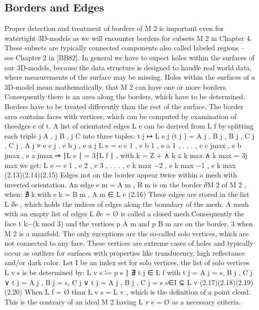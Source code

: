 \documentclass[openany]{book}
\begin{document}
\subsection{Borders and Edges}
Proper detection and treatment of borders of M 2 is important even for watertight
3D-models as we will encounter borders for subsets M 2 in Chapter 4. These 
subsets are typically connected components also called labeled regions – see 
Chapter 2 in [BB82]. In general we have to expect holes within the surfaces of 
our 3D-models, because the data structure is designed to handle real world data, 
where measurements of the surface may be missing.
Holes within the surfaces of a 3D-model mean mathematically, that M 2 can have 
one or more borders. Consequently there is an area along the borders, which have 
to be determined. Borders have to be treated differently than the rest of the 
surface. The border area contains faces with vertices, which can be computed by 
examination of theedges e of t. A list of orientated edges L e can be derived 
from L f by splitting each triple
{j A , j B , j C } into three tuples:
t j ↦ L e j (t j ) = {{A j , B j }, {B j , C j }, {C j , A j }} ≡ {e c j , 
e b j , e a j }
L e = { e c 1 , e b 1 , e a 1 , . . . , e c jmax , e b jmax , e a jmax }
⇒ ∣L e ∣ = 3∣L f ∣ , with k = Z + ∧ k ≤ k max ∧ k max = 3j max we get:
L e = { e 1 , e 2 , e 3 , . . . , e k max −2 , e k max −1 , e k max }
(2.13)(2.14)(2.15)
Edges not on the border appear twice within a mesh with inverted orientation. 
An edge e m = {A m , B m } is on the border ∂M 2 of M 2 , when: ∄ k with e k = 
{B m , A m } ∈ L e (2.16)
These edges are stored in the list L ∂e , which holds the indices of edges along 
the boundary of the mesh. A mesh with an empty list of edges L ∂e = Ø is called 
a closed mesh.Consequently the face t k−(k mod 3) and the vertices p A m and p B 
m are on the border, 3
when M 2 is a manifold. The only exceptions are the so-called solo vertices, 
which are not connected to any face. These vertices are extreme cases of holes 
and typically occur as outliers for surfaces with properties like translucency, 
high reflectance and/or dark color. Let I be an index set for solo vertices, the 
list of solo vertices L v s is be determined by:
L v s ∶= {p s ∣ ∄ t j ∈ L f with
t j = {A j = s, B j , C j }∨
t j = {A j , B j = s, C j }∨
t j = {A j , B j , C j = s}} s∈I ⊆ L v
(2.17)(2.18)(2.19)(2.20)
When L f = Ø than L v s = L v , which is the definition of a point cloud. This 
is the contrary of an ideal M 2 having L v s = Ø as a necessary 
criteria.~\cite[p.~28]{Mara12}
\end{document}
